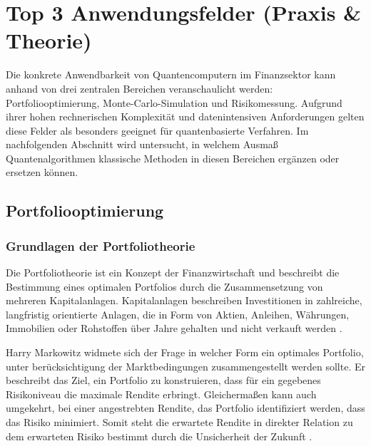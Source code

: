 \section{Top 3 Anwendungsfelder (Praxis \& Theorie)}
Die konkrete Anwendbarkeit von Quantencomputern im Finanzsektor kann anhand von drei zentralen Bereichen veranschaulicht werden: Portfoliooptimierung, Monte-Carlo-Simulation und Risikomessung. Aufgrund ihrer hohen rechnerischen Komplexität und datenintensiven Anforderungen gelten diese Felder als besonders geeignet für quantenbasierte Verfahren. Im nachfolgenden Abschnitt wird untersucht, in welchem Ausmaß Quantenalgorithmen klassische Methoden in diesen Bereichen ergänzen oder ersetzen können.

\subsection{Portfoliooptimierung}

\subsubsection*{Grundlagen der Portfoliotheorie}

Die Portfoliotheorie ist ein Konzept der Finanzwirtschaft und beschreibt die Bestimmung eines optimalen Portfolios durch die Zusammensetzung von mehreren Kapitalanlagen. Kapitalanlagen beschreiben Investitionen in zahlreiche, langfristig orientierte Anlagen, die in Form von Aktien, Anleihen, Währungen, Immobilien oder Rohstoffen über Jahre gehalten und nicht verkauft werden 
\cite{orus2019,sakuler2025}.
 
Harry Markowitz widmete sich der Frage in welcher Form ein optimales Portfolio, unter berücksichtigung der Marktbedingungen zusammengestellt werden sollte. Er beschreibt das Ziel, ein Portfolio zu konstruieren, dass für ein gegebenes Risikoniveau die maximale Rendite erbringt. Gleichermaßen kann auch umgekehrt, bei einer angestrebten Rendite, das Portfolio identifiziert werden, dass das Risiko minimiert. Somit steht die erwartete Rendite in direkter Relation zu dem erwarteten Risiko bestimmt durch die Unsicherheit der Zukunft
\cite{mondello2017,markowitz1959}.
 
